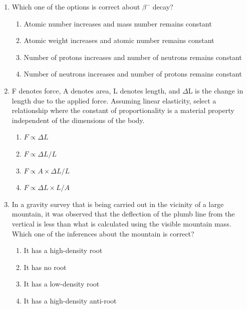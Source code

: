 \documentclass[journal,12pt,onecolumn]{IEEEtran}
\theoremstyle{remark}
\begin{document}
\begin{enumerate}
\item Which one of the options is correct about $\beta^-$ decay? \hfill{}
\begin{enumerate}
    \item Atomic number increases and mass number remains constant
    \item Atomic weight increases and atomic number remains constant
    \item Number of protons increases and number of neutrons remains constant
    \item Number of neutrons increases and number of protons remains constant
\end{enumerate}

\item F denotes force, A denotes area, L denotes length, and $\Delta$L is the change in length due to the applied force. Assuming linear elasticity, select a relationship where the constant of proportionality is a material property independent of the dimensions of the body. \hfill{}
\begin{enumerate}
    \item $F \propto \Delta L$
    \item $F \propto \Delta L/L$
    \item $F \propto A \times \Delta L/L$
    \item $F \propto \Delta L \times L/A$
\end{enumerate}

\item In a gravity survey that is being carried out in the vicinity of a large mountain, it was observed that the deflection of the plumb line from the vertical is less than what is calculated using the visible mountain mass. Which one of the inferences about the mountain is correct? \hfill{}
\begin{enumerate}
    \item It has a high-density root
    \item It has no root
    \item It has a low-density root
    \item It has a high-density anti-root
\end{enumerate}


\end{enumerate}
\end{document}
